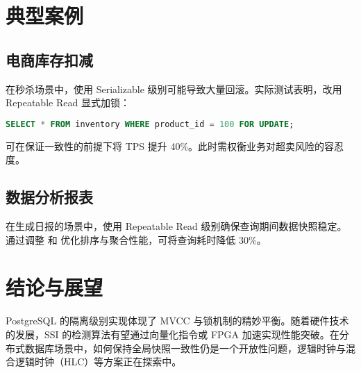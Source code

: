 \chapter{典型案例}
\section{电商库存扣减}
在秒杀场景中，使用 Serializable 级别可能导致大量回滚。实际测试表明，改用 Repeatable Read 显式加锁：\par
\begin{lstlisting}[language=sql]
SELECT * FROM inventory WHERE product_id = 100 FOR UPDATE;
\end{lstlisting}
可在保证一致性的前提下将 TPS 提升 40\%{}。此时需权衡业务对超卖风险的容忍度。\par
\section{数据分析报表}
在生成日报的场景中，使用 Repeatable Read 级别确保查询期间数据快照稳定。通过调整  和  优化排序与聚合性能，可将查询耗时降低 30\%{}。\par
\chapter{结论与展望}
PostgreSQL 的隔离级别实现体现了 MVCC 与锁机制的精妙平衡。随着硬件技术的发展，SSI 的检测算法有望通过向量化指令或 FPGA 加速实现性能突破。在分布式数据库场景中，如何保持全局快照一致性仍是一个开放性问题，逻辑时钟与混合逻辑时钟（HLC）等方案正在探索中。\par
